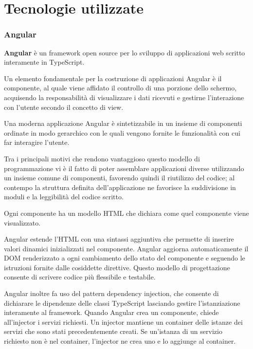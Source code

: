 \clearpage{\pagestyle{empty}\cleardoublepage}
\chapter{Tecnologie utilizzate}                %

\subsection{Angular}
\textbf{Angular} è un framework open source per lo sviluppo di applicazioni web scritto interamente in TypeScript.

Un elemento fondamentale per la costruzione di applicazioni Angular è il componente, al quale viene affidato il controllo di una porzione dello schermo, acquisendo la responsabilità di visualizzare i dati ricevuti e gestirne l’interazione con l’utente secondo il concetto di view.

Una moderna applicazione Angular è sintetizzabile in un insieme di componenti ordinate in modo gerarchico con le quali vengono fornite le funzionalità con cui far interagire l’utente.

Tra i principali motivi che rendono vantaggioso questo modello di programmazione vi è il fatto di poter assemblare applicazioni diverse utilizzando un insieme comune di componenti, favorendo quindi il riutilizzo del codice; al contempo la struttura definita dell’applicazione ne favorisce la suddivisione in moduli e la leggibilità del codice scritto.

\vspace{5mm}

Ogni componente ha un modello HTML che dichiara come quel componente viene visualizzato.

Angular estende l'HTML con una sintassi aggiuntiva che permette di inserire valori dinamici inizializzati nel componente. Angular aggiorna automaticamente il DOM renderizzato a ogni cambiamento dello stato del componente e seguendo le istruzioni fornite dalle cosiddette direttive. Questo modello di progettazione consente di scrivere codice più flessibile e testabile.

Angular inoltre fa uso del pattern dependency injection, che consente di dichiarare le dipendenze delle classi TypeScript lasciando gestire l'istanziazione interamente al framework. Quando Angular crea un componente, chiede all’injector i servizi richiesti. Un injector mantiene un container delle istanze dei servizi che sono stati precedentemente creati. Se un’istanza di un servizio richiesto non è nel container, l’injector ne crea uno e lo aggiunge al container.

